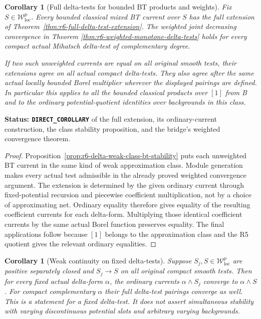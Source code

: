 \documentclass[11pt,a4paper]{article}
\numberwithin{equation}{section}
\newtheorem{corollary}[theorem]{Corollary}
\theoremstyle{definition}
\theoremstyle{remark}
\begin{document}
\begin{corollary}[Full delta-tests for bounded BT products and weights]
\label{cor:r6-full-delta-bounded-bt}
Fix $S\in\mathcal W^p_{\mathrm{loc}}$. Every bounded
classical mixed BT current over $S$ has the full extension
of Theorem~\ref{thm:r6-full-delta-test-extension}. The
weighted joint decreasing convergence in Theorem
\ref{thm:r6-weighted-monotone-delta-tests} holds for every
compact actual Mihatsch delta-test of complementary degree.

If two such unweighted currents are equal on all original
smooth tests, their extensions agree on all actual compact
delta-tests. They also agree after the same actual locally
bounded Borel multiplier wherever the displayed pairings
are defined. In particular this applies to all the bounded
classical products over $[1]$ from B and to the ordinary
potential-quotient identities over backgrounds in this class.
\end{corollary}

\noindent\textbf{Status: \texttt{DIRECT\_COROLLARY}} of
the full extension, its ordinary-current construction,
the class stability proposition, and the bridge's weighted
convergence theorem.

\begin{proof}
Proposition~\ref{prop:r6-delta-weak-class-bt-stability}
puts each unweighted BT current in the same kind of
weak approximation class. Module generation makes every
actual test admissible in the already proved weighted
convergence argument. The extension is determined by
the given ordinary current through fixed-potential
recursion and piecewise coefficient multiplication, not
by a choice of approximating net. Ordinary equality
therefore gives equality of the resulting coefficient
currents for each delta-form. Multiplying those identical
coefficient currents by the same actual Borel function
preserves equality. The final applications follow because
$[1]$ belongs to the approximation class and the R5
quotient gives the relevant ordinary equalities.
\end{proof}

\begin{corollary}[Weak continuity on fixed delta-tests]
\label{cor:r6-weak-continuity-full-delta-tests}
Suppose $S_j,S\in\mathcal W^p_{\mathrm{loc}}$ are positive
separately closed and $S_j\to S$ on all original compact
smooth tests. Then for every fixed actual delta-form
$\alpha$, the ordinary currents $\alpha\wedge S_j$
converge to $\alpha\wedge S$. For compact complementary
$\alpha$ their full delta-test pairings converge as well.
This is a statement for a fixed delta-test. It does not
assert simultaneous stability with varying discontinuous
potential slots and arbitrary varying backgrounds.
\end{corollary}
\end{document}
